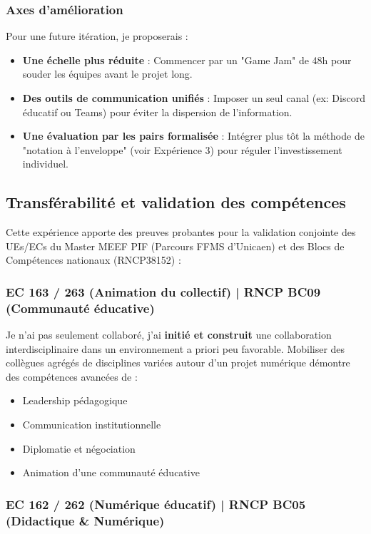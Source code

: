 \subsubsection{Axes d'amélioration}
Pour une future itération, je proposerais :
\begin{itemize}
    \item \textbf{Une échelle plus réduite} : Commencer par un "Game Jam" de 48h pour souder les équipes avant le projet long.
    \item \textbf{Des outils de communication unifiés} : Imposer un seul canal (ex: Discord éducatif ou Teams) pour éviter la dispersion de l'information.
    \item \textbf{Une évaluation par les pairs formalisée} : Intégrer plus tôt la méthode de "notation à l'enveloppe" (voir Expérience 3) pour réguler l'investissement individuel.
\end{itemize}

\subsection{Transférabilité et validation des compétences}

Cette expérience apporte des preuves probantes pour la validation conjointe des UEs/ECs du Master MEEF PIF (Parcours FFMS d'Unicaen) et des Blocs de Compétences nationaux (RNCP38152) :

\subsubsection{EC 163 / 263 (Animation du collectif) | RNCP BC09 (Communauté éducative)}

Je n'ai pas seulement collaboré, j'ai \textbf{initié et construit} une collaboration interdisciplinaire dans un environnement a priori peu favorable. Mobiliser des collègues agrégés de disciplines variées autour d'un projet numérique démontre des compétences avancées de :
\begin{itemize}[leftmargin=*]
    \item Leadership pédagogique
    \item Communication institutionnelle
    \item Diplomatie et négociation
    \item Animation d'une communauté éducative \parencite{competences_transversales}
\end{itemize}

\subsubsection{EC 162 / 262 (Numérique éducatif) | RNCP BC05 (Didactique \& Numérique)}

